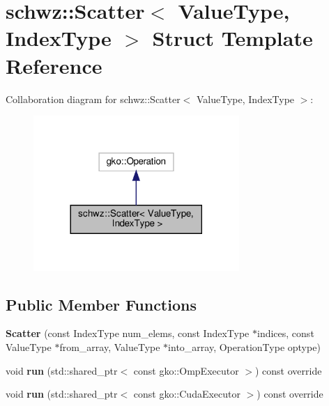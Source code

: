 \hypertarget{structschwz_1_1Scatter}{}\section{schwz\+:\+:Scatter$<$ Value\+Type, Index\+Type $>$ Struct Template Reference}
\label{structschwz_1_1Scatter}


Collaboration diagram for schwz\+:\+:Scatter$<$ Value\+Type, Index\+Type $>$\+:
\nopagebreak
\begin{figure}[H]
\begin{center}
\leavevmode
\includegraphics[width=221pt]{structschwz_1_1Scatter__coll__graph}
\end{center}
\end{figure}
\subsection*{Public Member Functions}
\begin{DoxyCompactItemize}
\item 
\mbox{\label{structschwz_1_1Scatter_acf606095b1eb3546aa858a76ffe4b0e3}} 
{\bfseries Scatter} (const Index\+Type num\+\_\+elems, const Index\+Type $\ast$indices, const Value\+Type $\ast$from\+\_\+array, Value\+Type $\ast$into\+\_\+array, Operation\+Type optype)
\item 
\mbox{\label{structschwz_1_1Scatter_a4887ae16bc4abacf64366359ab9b6ef6}} 
void {\bfseries run} (std\+::shared\+\_\+ptr$<$ const gko\+::\+Omp\+Executor $>$) const override
\item 
\mbox{\label{structschwz_1_1Scatter_a12807bf0b409347b9a5e7c948b93be32}} 
void {\bfseries run} (std\+::shared\+\_\+ptr$<$ const gko\+::\+Cuda\+Executor $>$) const override
\end{DoxyCompactItemize}
